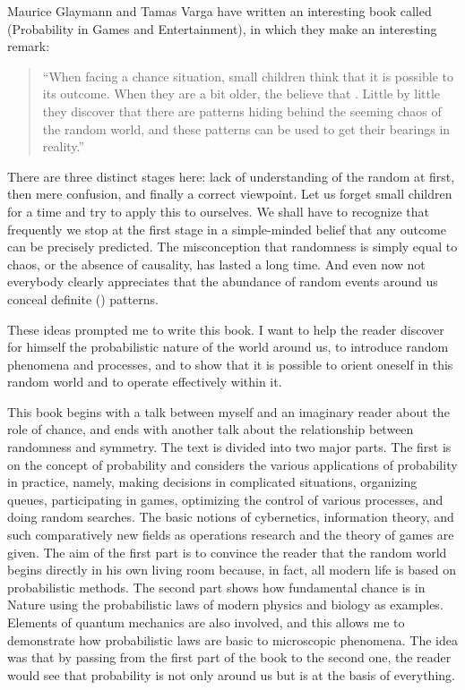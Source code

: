 Maurice Glaymann and Tamas Varga have written an interesting book
called  (Probability in Games
and Entertainment), in which they make an interesting remark: 
\begin{quote}
``When facing a chance situation, small children think that it is possible to   its outcome. When they are a bit older, the believe that  . Little by little they discover that there are patterns hiding behind the seeming chaos of the random world, and these patterns can be used to get their bearings in
reality.''
\end{quote}
There are three distinct stages here: lack of understanding
of the random at first, then mere confusion, and finally a correct
viewpoint. Let us forget small children for a time and try to apply
this to ourselves. We shall have to recognize that frequently we stop
at the first stage in a simple-minded belief that any outcome can be
precisely predicted. The misconception that randomness is simply equal
to chaos, or the absence of causality, has lasted a long time. And
even now not everybody clearly appreciates that the abundance of
random events around us conceal definite ()
patterns.

These ideas prompted me to write this book. I want to help
the reader discover for himself the probabilistic nature of the world
around us, to introduce random phenomena and processes, and to show
that it is possible to orient oneself in this random world and to
operate effectively within it.  

This book begins with a talk between myself and an imaginary reader
about the role of chance, and ends with another talk about the
relationship between randomness and symmetry. The text is divided into
two major parts. The first is on the concept of probability and
considers the various applications of probability in practice, namely,
making decisions in complicated situations, organizing queues,
participating in games, optimizing the control of various processes,
and doing random searches. The basic notions of cybernetics,
information theory, and such comparatively new fields as operations
research and the theory of games are given. The aim of the first part
is to convince the reader that the random world begins directly in his
own living room because, in fact, all modern life is based on
probabilistic methods. The second part shows how fundamental chance is
in Nature using the probabilistic laws of modern physics and biology
as examples. Elements of quantum mechanics are also involved, and this
allows me to demonstrate how probabilistic laws are basic to
microscopic phenomena. The idea was that by passing from the first
part of the book to the second one, the reader would see that
probability is not only around us but is at the basis of everything.

